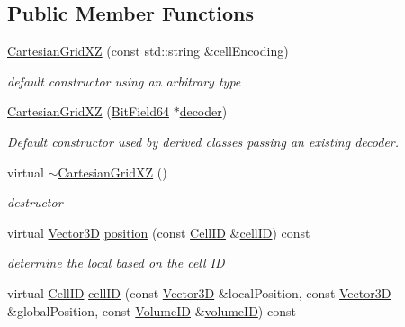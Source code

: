 \subsection*{Public Member Functions}
\begin{DoxyCompactItemize}
\item 
\hyperlink{class_d_d4hep_1_1_d_d_segmentation_1_1_cartesian_grid_x_z_a30db21b84e994f6e735274ac33a2b6af}{Cartesian\+Grid\+XZ} (const std\+::string \&cell\+Encoding)
\begin{DoxyCompactList}\small\item\em default constructor using an arbitrary type \end{DoxyCompactList}\item 
\hyperlink{class_d_d4hep_1_1_d_d_segmentation_1_1_cartesian_grid_x_z_a0a3f69150eb5dae849511529138ba094}{Cartesian\+Grid\+XZ} (\hyperlink{class_d_d4hep_1_1_d_d_segmentation_1_1_bit_field64}{Bit\+Field64} $\ast$\hyperlink{class_d_d4hep_1_1_d_d_segmentation_1_1_segmentation_abec3489982d0fe91ef4b142d9d755576}{decoder})
\begin{DoxyCompactList}\small\item\em Default constructor used by derived classes passing an existing decoder. \end{DoxyCompactList}\item 
virtual \hyperlink{class_d_d4hep_1_1_d_d_segmentation_1_1_cartesian_grid_x_z_a2e43952843eb3f66c0ab65c779045b1f}{$\sim$\+Cartesian\+Grid\+XZ} ()
\begin{DoxyCompactList}\small\item\em destructor \end{DoxyCompactList}\item 
virtual \hyperlink{struct_d_d4hep_1_1_d_d_segmentation_1_1_vector3_d}{Vector3D} \hyperlink{class_d_d4hep_1_1_d_d_segmentation_1_1_cartesian_grid_x_z_a8ed53ce402a08aedea07c6a015abb0e8}{position} (const \hyperlink{namespace_d_d4hep_1_1_d_d_segmentation_ac7af071d85cb48820914434a07e21ba1}{Cell\+ID} \&\hyperlink{class_d_d4hep_1_1_d_d_segmentation_1_1_cartesian_grid_x_z_a78be61402af91066cf8e5048ed5441c5}{cell\+ID}) const
\begin{DoxyCompactList}\small\item\em determine the local based on the cell ID \end{DoxyCompactList}\item 
virtual \hyperlink{namespace_d_d4hep_1_1_d_d_segmentation_ac7af071d85cb48820914434a07e21ba1}{Cell\+ID} \hyperlink{class_d_d4hep_1_1_d_d_segmentation_1_1_cartesian_grid_x_z_a78be61402af91066cf8e5048ed5441c5}{cell\+ID} (const \hyperlink{struct_d_d4hep_1_1_d_d_segmentation_1_1_vector3_d}{Vector3D} \&local\+Position, const \hyperlink{struct_d_d4hep_1_1_d_d_segmentation_1_1_vector3_d}{Vector3D} \&global\+Position, const \hyperlink{namespace_d_d4hep_1_1_d_d_segmentation_a61a6833a18d1800bdef176595f83e3ba}{Volume\+ID} \&\hyperlink{class_d_d4hep_1_1_d_d_segmentation_1_1_segmentation_a43c0e9648e3b7cded015847c0802f757}{volume\+ID}) const

\end{DoxyCompactItemize}
